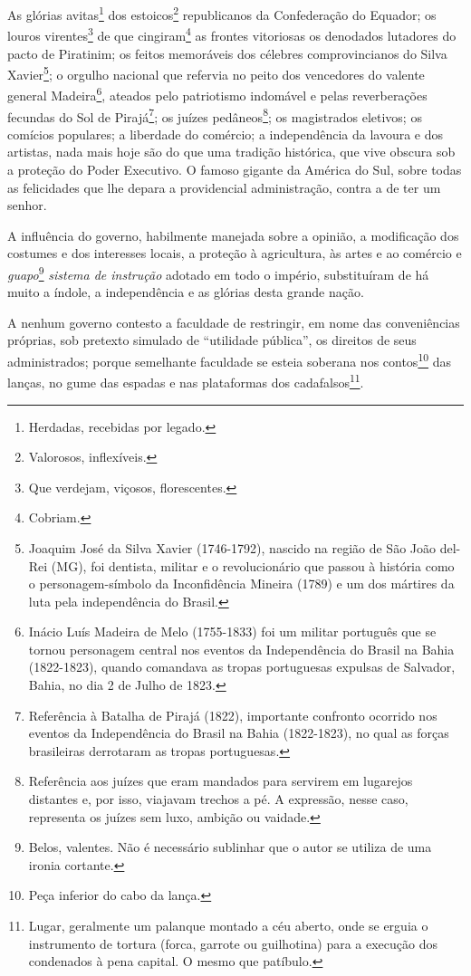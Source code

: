 As glórias avitas\footnote{Herdadas, recebidas por legado.} dos
estoicos\footnote{Valorosos, inflexíveis.} republicanos da
Confederação do Equador; os louros virentes\footnote{Que verdejam,
  viçosos, florescentes.} de que cingiram\footnote{Cobriam.} as
frontes vitoriosas os denodados lutadores do pacto de Piratinim; os
feitos memoráveis dos célebres comprovincianos do Silva
Xavier\footnote{Joaquim José da Silva Xavier (1746-1792), nascido na
  região de São João del-Rei (MG), foi dentista, militar e o
  revolucionário que passou à história como o personagem-símbolo da
  Inconfidência Mineira (1789) e um dos mártires da luta pela
  independência do Brasil.}; o orgulho nacional que refervia no peito
dos vencedores do valente general Madeira\footnote{Inácio Luís Madeira
  de Melo (1755-1833) foi um militar português que se tornou personagem
  central nos eventos da Independência do Brasil na Bahia (1822-1823),
  quando comandava as tropas portuguesas expulsas de Salvador, Bahia, no
  dia 2 de Julho de 1823.}, ateados pelo patriotismo indomável e pelas
reverberações fecundas do Sol de Pirajá\footnote{Referência à Batalha
  de Pirajá (1822), importante confronto ocorrido nos eventos da
  Independência do Brasil na Bahia (1822-1823), no qual as forças
  brasileiras derrotaram as tropas portuguesas.}; os juízes
pedâneos\footnote{Referência aos juízes que eram mandados para
  servirem em lugarejos distantes e, por isso, viajavam trechos a pé. A
  expressão, nesse caso, representa os juízes sem luxo, ambição ou
  vaidade.}; os magistrados eletivos; os comícios populares; a liberdade
do comércio; a independência da lavoura e dos artistas, nada mais hoje
são do que uma tradição histórica, que vive obscura sob a proteção do
Poder Executivo. O famoso gigante da América do Sul, sobre todas as
felicidades que lhe depara a providencial administração, contra a de ter
um senhor.

A influência do governo, habilmente manejada sobre a opinião, a
modificação dos costumes e dos interesses locais, a proteção à
agricultura, às artes e ao comércio e \emph{guapo}\footnote{Belos,
  valentes. Não é necessário sublinhar que o autor se utiliza de uma
  ironia cortante.} \emph{sistema de instrução} adotado em todo o
império, substituíram de há muito a índole, a independência e as glórias
desta grande nação.

A nenhum governo contesto a faculdade de restringir, em nome das
conveniências próprias, sob pretexto simulado de ``utilidade pública'', os
direitos de seus administrados; porque semelhante faculdade se esteia
soberana nos contos\footnote{Peça inferior do cabo da lança.} das
lanças, no gume das espadas e nas plataformas dos cadafalsos\footnote{
  Lugar, geralmente um palanque montado a céu aberto, onde se erguia o
  instrumento de tortura (forca, garrote ou guilhotina) para a execução
  dos condenados à pena capital. O mesmo que patíbulo.}.

